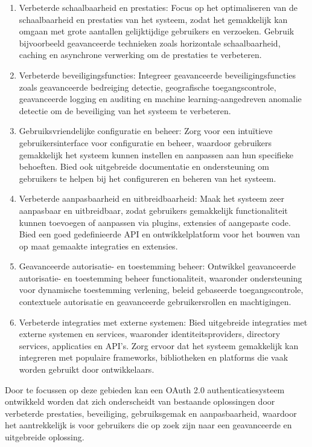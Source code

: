 \begin{enumerate}
  \item Verbeterde schaalbaarheid en prestaties: Focus op het optimaliseren van de schaalbaarheid en prestaties van het systeem, zodat het gemakkelijk kan omgaan met grote aantallen gelijktijdige gebruikers en verzoeken. Gebruik bijvoorbeeld geavanceerde technieken zoals horizontale schaalbaarheid, caching en asynchrone verwerking om de prestaties te verbeteren.
  
  \item Verbeterde beveiligingsfuncties: Integreer geavanceerde beveiligingsfuncties zoals geavanceerde bedreiging detectie, geografische toegangscontrole, geavanceerde logging en auditing en machine learning-aangedreven anomalie detectie om de beveiliging van het systeem te verbeteren.
  
  \item Gebruiksvriendelijke configuratie en beheer: Zorg voor een intuïtieve gebruikersinterface voor configuratie en beheer, waardoor gebruikers gemakkelijk het systeem kunnen instellen en aanpassen aan hun specifieke behoeften. Bied ook uitgebreide documentatie en ondersteuning om gebruikers te helpen bij het configureren en beheren van het systeem.
  
  \item Verbeterde aanpasbaarheid en uitbreidbaarheid: Maak het systeem zeer aanpasbaar en uitbreidbaar, zodat gebruikers gemakkelijk functionaliteit kunnen toevoegen of aanpassen via plugins, extensies of aangepaste code. Bied een goed gedefinieerde API en ontwikkelplatform voor het bouwen van op maat gemaakte integraties en extensies.
  
  \item Geavanceerde autorisatie- en toestemming beheer: Ontwikkel geavanceerde autorisatie- en toestemming beheer functionaliteit, waaronder ondersteuning voor dynamische toestemming verlening, beleid gebaseerde toegangscontrole, contextuele autorisatie en geavanceerde gebruikersrollen en machtigingen.
  
  \item Verbeterde integraties met externe systemen: Bied uitgebreide integraties met externe systemen en services, waaronder identiteitsproviders, directory services, applicaties en API's. Zorg ervoor dat het systeem gemakkelijk kan integreren met populaire frameworks, bibliotheken en platforms die vaak worden gebruikt door ontwikkelaars.
\end{enumerate}

Door te focussen op deze gebieden kan een OAuth 2.0 authenticatiesysteem ontwikkeld worden dat zich onderscheidt van bestaande oplossingen door verbeterde prestaties, beveiliging, gebruiksgemak en aanpasbaarheid, waardoor het aantrekkelijk is voor gebruikers die op zoek zijn naar een geavanceerde en uitgebreide oplossing.
